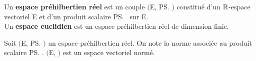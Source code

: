 \vspace{1.5cm}

Un \textbf{espace préhilbertien réel} est un couple $\bigl($E, \ps$\bigr)$ constitué d'un \(\mathbb{R}\)-espace vectoriel E et d'un produit scalaire \ps \ sur E.\\
Un \textbf{espace euclidien} est un espace préhilbertien réel de dimension finie.

\vspace{1.5cm}

\noindent Soit $\bigl($E, \ps$\bigr)$ un espace préhilbertien réel. On note \normtxt{\ } la norme associée au produit\vspace{0.1cm}\\
scalaire \ps. $\bigl($E, \normtxt{\ }$\bigr)$ est un espace vectoriel normé.\vspace{0.2cm}
